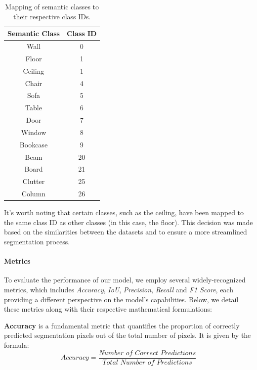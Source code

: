 \documentclass[11pt, a4paper,oneside,chapterprefix=false]{scrbook}
\begin{document}
\begin{table}[H]
    \centering
    \begin{tabular}{|c|c|}
        \hline
        \textbf{Semantic Class} & \textbf{Class ID} \\
        \hline
        Wall & 0 \\
        Floor & 1 \\
        Ceiling & 1 \\
        Chair & 4 \\
        Sofa & 5 \\
        Table & 6 \\
        Door & 7 \\
        Window & 8 \\
        Bookcase & 9 \\
        Beam & 20 \\
        Board & 21 \\
        Clutter & 25 \\
        Column & 26 \\
        \hline
    \end{tabular}
    \caption{Mapping of semantic classes to their respective class IDs.}
    \label{tab:semantic_classes}
\end{table}

It's worth noting that certain classes, such as the ceiling, have been mapped to the same class ID as other classes (in this case, the floor). This decision was made based on the similarities between the datasets and to ensure a more streamlined segmentation process.

\paragraph{Metrics}

To evaluate the performance of our model, we employ several widely-recognized metrics, which includes \textit{Accuracy}, \textit{IoU}, \textit{Precision}, \textit{Recall} and \textit{F1 Score}, each providing a different perspective on the model's capabilities. Below, we detail these metrics along with their respective mathematical formulations:

\vspace{10pt}

\textbf{Accuracy} is a fundamental metric that quantifies the proportion of correctly predicted segmentation pixels out of the total number of pixels. It is given by the formula:
\[
	\textit{Accuracy} = \frac{\textit{Number of Correct Predictions}}{\textit{Total Number of Predictions}}
\]
\end{document}
